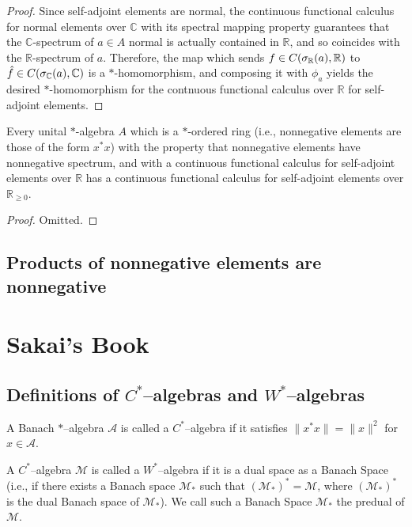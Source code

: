 \begin{proof}
  \leanok
  Since self-adjoint elements are normal, the continuous functional calculus for normal elements over $\mathbb{C}$ with its spectral mapping property guarantees that the $\mathbb{C}$-spectrum of $a \in A$ normal is actually contained in $\mathbb{R}$, and so coincides with the $\mathbb{R}$-spectrum of $a$.
  Therefore, the map which sends $f \in C(\spectrum[\mathbb{R}]{a}, \mathbb{R})$ to $\hat f \in C(\spectrum[\mathbb{C}]{a}, \mathbb{C})$ is a $*$-homomorphism, and composing it with $\phi_a$ yields the desired $*$-homomorphism for the contnuous functional calculus over $\mathbb{R}$ for self-adjoint elements.
\end{proof}

\begin{theorem}
  \label{thm:cfc_real_to_nnreal}
  \mathlibok
  Every unital $*$-algebra $A$ which is a $*$-ordered ring (i.e., nonnegative elements are those of the form $x^* x$) with the property that nonnegative elements have nonnegative spectrum, and with a continuous functional calculus for self-adjoint elements over $\mathbb{R}$ has a continuous functional calculus for self-adjoint elements over $\mathbb{R}_{\ge 0}$.
\end{theorem}

\begin{proof}
  \leanok
  Omitted.
\end{proof}


\section{Products of nonnegative elements are nonnegative}

\chapter{Sakai's Book}

\section{Definitions of $C^{*}$--algebras and $W^{*}$--algebras}

\begin{definition}
  \label{def:CStarAlgebra}
  \notready
  A Banach $*$--algebra $\mathcal{A}$ is called a $C^{*}$--algebra if it satisfies $\|x^{*}x\|=\|x\|^2$ for $x\in \mathcal{A}$.
\end{definition}

\begin{definition}
  \label{def:WStarAlgebra}
  \notready
  A $C^{*}$--algebra $\mathcal{M}$ is called a $W^{*}$--algebra if it is a dual space as a Banach Space (i.e., if there exists 
  a Banach space $\mathcal{M}_{*}$ such that $(\mathcal{M}_{*})^{*}=\mathcal{M}$, where $(\mathcal{M}_{*})^{*}$ is the dual Banach
  space of $\mathcal{M_{*}}$). We call such a Banach Space $\mathcal{M_{*}}$ the predual of $\mathcal{M}$.
\end{definition}